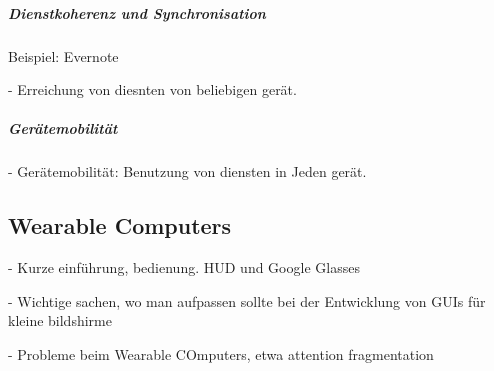 \subparagraph{Dienstkoherenz und Synchronisation} %
\label{subp:diensmobilit_t}

Beispiel: Evernote

- Erreichung von diesnten von beliebigen gerät.

\subparagraph{Gerätemobilität} %
\label{subp:ger_temobilit_t}

- Gerätemobilität: Benutzung von diensten in Jeden gerät. 


\subsection{Wearable Computers} %
\label{sub:wearable_computers}

- Kurze einführung, bedienung. HUD und Google Glasses

- Wichtige sachen, wo man aufpassen sollte bei der Entwicklung von GUIs für kleine bildshirme

- Probleme beim Wearable COmputers, etwa attention fragmentation


